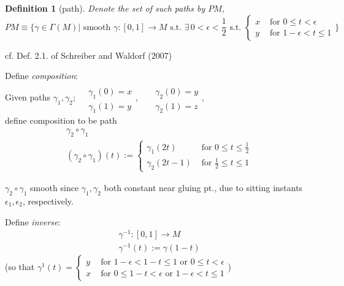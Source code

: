 \documentclass[10pt]{amsart}
\newtheorem{definition}{Definition}
\begin{document}
\begin{multicols*}{2}
\begin{definition}[path]
Denote the set of such paths by $PM$, 
\begin{equation}
PM \equiv \lbrace \gamma \in \Gamma(M) | \text{ smooth } \gamma : [0,1] \to M \text{ s.t. } \exists \, 0 < \epsilon < \frac{1}{2} \text{ s.t. } \begin{cases} x & \text{ for } 0 \leq t < \epsilon \\
y & \text{ for } 1 - \epsilon < t \leq 1 \end{cases} \rbrace
\end{equation}
\end{definition}
cf. Def. 2.1. of Schreiber and Waldorf (2007)\cite{ScWa2007}  

Define \emph{composition}: \\
Given paths $\gamma_1, \gamma_2$; $\begin{aligned} & \qquad \\ 
& \gamma_1(0) = x \\
& \gamma_1(1) = y \end{aligned}$, \, $\begin{aligned} & \qquad \\ 
& \gamma_2(0) = y \\
& \gamma_2(1) = z \end{aligned}$, \\
define composition to be path 
\begin{equation}
\begin{gathered}
\gamma_2 \circ \gamma_1 \\
(\gamma_2 \circ \gamma_1)(t) := \begin{cases} \gamma_1(2t) & \text{ for } 0 \leq t \leq \frac{1}{2} \\
\gamma_2(2t-1) & \text{ for } \frac{1}{2} \leq t \leq 1 \end{cases} 
\end{gathered}
\end{equation}

$\gamma_2 \circ \gamma_1$ smooth since $\gamma_1, \gamma_2$ both constant near gluing pt., due to sitting instants $\epsilon_1, \epsilon_2$, respectively. 

Define \emph{inverse}:
\begin{equation}
\begin{gathered}
\gamma^{-1} : [0,1] \to M \\
\gamma^{-1}(t) := \gamma(1-t)
\end{gathered}
\end{equation}
(so that $\gamma^{1}(t) =  \begin{cases} y & \text{ for } 1-\epsilon < 1-t \leq 1 \text{ or } 0 \leq t < \epsilon  \\
x & \text{ for } 0  \leq 1 - t < \epsilon \text{ or } 1 - \epsilon < t \leq 1 \end{cases}$)


\end{multicols*}
\end{document}
